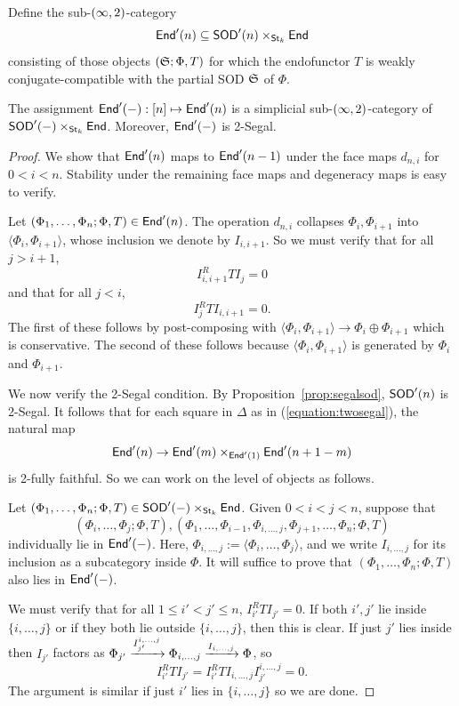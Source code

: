 Define the sub-$(\infty,2)$-category
\[\mathsf{End}'(n)\subseteq \mathsf{SOD}'(n)\times_{\mathsf{St}_k}\mathsf{End}\]
consisting of those objects $(\mathfrak{S};\Phi,T)$ for which the endofunctor $T$ is weakly conjugate-compatible with the partial SOD $\mathfrak{S}$ of $\Phi$.

\begin{prop}\label{prop:segalend}
    The assignment $\mathsf{End}'(-):[n]\mapsto \mathsf{End}'(n)$ is a simplicial sub-$(\infty,2)$-category of $\mathsf{SOD}'(-)\times_{\mathsf{St}_k}\mathsf{End}$. Moreover, $\mathsf{End}'(-)$ is 2-Segal.
\end{prop}

\begin{proof}
    We show that $\mathsf{End}'(n)$ maps to $\mathsf{End}'(n-1)$ under the face maps $d_{n,i}$ for $0<i<n$. Stability under the remaining face maps and degeneracy maps is easy to verify.

    Let $(\Phi_1,\dots,\Phi_n;\Phi,T)\in \mathsf{End}'(n)$. The operation $d_{n,i}$ collapses $\Phi_i,\Phi_{i+1}$ into $\langle\Phi_i,\Phi_{i+1}\rangle$, whose inclusion we denote by $I_{i,i+1}$. So we must verify that for all $j>i+1$,
    \[I_{i,i+1}^R T I_{j} = 0\]
    and that for all $j<i$,
    \[I_j^R T I_{i,i+1} = 0.\]
    The first of these follows by post-composing with $\langle\Phi_i,\Phi_{i+1}\rangle\to \Phi_i\oplus\Phi_{i+1}$ which is conservative. The second of these follows because $\langle\Phi_i,\Phi_{i+1}\rangle$ is generated by $\Phi_i$ and $\Phi_{i+1}$.

    We now verify the 2-Segal condition. By Proposition~\ref{prop:segalsod}, $\mathsf{SOD}'(n)$ is 2-Segal. It follows that for each square in $\Delta$ as in (\ref{equation:twosegal}), the natural map
    \[\mathsf{End}'(n)\to \mathsf{End}'(m)\times_{\mathsf{End}'(1)}\mathsf{End}'(n+1-m)\]
    is 2-fully faithful. So we can work on the level of objects as follows.
    
    Let $(\Phi_1,\dots,\Phi_n;\Phi,T)\in \mathsf{SOD}'(-)\times_{\mathsf{St}_k}\mathsf{End}$. Given $0<i<j<n$, suppose that
    \[(\Phi_i,\dots,\Phi_j;\Phi,T), (\Phi_1,\dots,\Phi_{i-1},\Phi_{i,\dots,j},\Phi_{j+1},\dots,\Phi_n;\Phi,T)\]
    individually lie in $\mathsf{End}'(-)$. Here, $\Phi_{i,\dots,j} := \langle\Phi_i,\dots,\Phi_j\rangle$, and we write $I_{i,\dots,j}$ for its inclusion as a subcategory inside $\Phi$. It will suffice to prove that $(\Phi_1,\dots,\Phi_n;\Phi,T)$ also lies in $\mathsf{End}'(-)$.

    We must verify that for all $1\leq i' < j'\leq n$, $I_{i'}^RTI_{j'}=0$. If both $i',j'$ lie inside $\{i,\dots,j\}$ or if they both lie outside $\{i,\dots,j\}$, then this is clear. If just $j'$ lies inside then $I_{j'}$ factors as $\Phi_{j'}\xrightarrow{I_{j'}^{i,\dots,j}} \Phi_{i,\dots,j}\xrightarrow{I_{i,\dots,j}} \Phi$, so
    \[I_{i'}^RTI_{j'} = I_{i'}^RTI_{i,\dots,j}I_{j'}^{i,\dots,j}  = 0.\]
    The argument is similar if just $i'$ lies in $\{i,\dots,j\}$ so we are done.
\end{proof}

